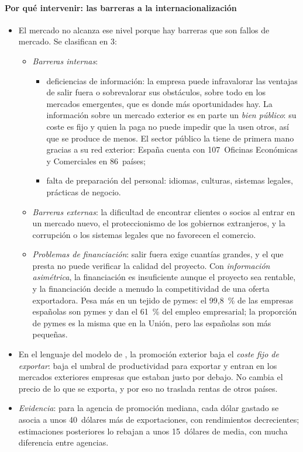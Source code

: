 \documentclass[11pt]{article}
\begin{document}
\paragraph{Por qué intervenir: las barreras a la internacionalización}

\begin{itemize}
\item El mercado no alcanza ese nivel porque hay barreras que son fallos de mercado. Se clasifican en 3:
  \begin{itemize}
  \item \emph{Barreras internas}:
    \begin{itemize}
    \item deficiencias de información: la empresa puede infravalorar las ventajas de salir fuera o sobrevalorar sus obstáculos, sobre todo en los mercados emergentes, que es donde más oportunidades hay. La información sobre un mercado exterior es en parte un \emph{bien público}: su coste es fijo y quien la paga no puede impedir que la usen otros, así que se produce de menos. El sector público la tiene de primera mano gracias a su red exterior: España cuenta con 107~Oficinas Económicas y Comerciales en 86~países\nocite{ICEX2026Memoria2025};
    \item falta de preparación del personal: idiomas, culturas, sistemas legales, prácticas de negocio.
    \end{itemize}
  \item \emph{Barreras externas}: la dificultad de encontrar clientes o socios al entrar en un mercado nuevo, el proteccionismo de los gobiernos extranjeros, y la corrupción o los sistemas legales que no favorecen el comercio.
  \item \emph{Problemas de financiación}: salir fuera exige cuantías grandes, y el que presta no puede verificar la calidad del proyecto. Con \emph{información asimétrica}, la financiación es insuficiente aunque el proyecto sea rentable, y la financiación decide a menudo la competitividad de una oferta exportadora. Pesa más en un tejido de pymes: el 99,8~\% de las empresas españolas son pymes y dan el 61~\% del empleo empresarial\nocite{MinIndustria2026CifrasPyme}; la proporción de pymes es la misma que en la Unión, pero las españolas son más pequeñas\nocite{Eurostat2026SBS}.
  \end{itemize}
\item En el lenguaje del modelo de  , la promoción exterior baja el \emph{coste fijo de exportar}: baja el umbral de productividad para exportar y entran en los mercados exteriores empresas que estaban justo por debajo. No cambia el precio de lo que se exporta, y por eso no traslada rentas de otros países.
\item \emph{Evidencia}: para la agencia de promoción mediana, cada dólar gastado se asocia a unos 40~dólares más de exportaciones, con rendimientos decrecientes\nocite{LedermanOlarreagaPayton2006WP,LedermanOlarreagaPayton2010}; estimaciones posteriores lo rebajan a unos 15~dólares de media\nocite{OlarreagaSperlichTrachsel2015WP}, con mucha diferencia entre agencias\nocite{OlarreagaSperlichTrachsel2020}.
\end{itemize}
\end{document}
